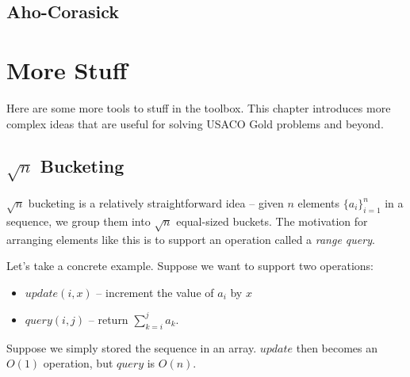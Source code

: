 \documentclass[11pt]{book}
\begin{document}
\section{Aho-Corasick}

\chapter{More Stuff}

Here are some more tools to stuff in the toolbox. This chapter introduces more complex ideas that are useful for solving USACO Gold problems and beyond.

\section{$\sqrt{n}$ Bucketing}

$\sqrt{n}$ bucketing is a relatively straightforward idea -- given $n$ elements $\{a_i\}_{i=1}^n$ in a sequence, we group them into $\sqrt{n}$ equal-sized buckets. The motivation for arranging elements like this is to support an operation called a \textit{range query}.

Let's take a concrete example. Suppose we want to support two operations:

\begin{itemize}
\item
$update(i, x)$ -- increment the value of $a_i$ by $x$

\item
$query(i, j)$ -- return $\sum_{k=i}^j a_k$.
\end{itemize}

Suppose we simply stored the sequence in an array. $update$ then becomes an $O(1)$ operation, but $query$ is $O(n)$.

\begin{center}
{
}
\end{center}
\end{document}
